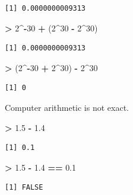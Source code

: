 \documentclass[]{krantz}
\makeatletter
\newenvironment{Shaded}{\begin{snugshade}}{\end{snugshade}}
\newcommand{\DecValTok}[1]{\textcolor[rgb]{0.06,0.06,0.06}{#1}}
\newcommand{\FloatTok}[1]{\textcolor[rgb]{0.06,0.06,0.06}{#1}}
\newcommand{\NormalTok}[1]{#1}
\newcommand{\OperatorTok}[1]{\textcolor[rgb]{0.43,0.43,0.43}{\textbf{#1}}}
\newcommand{\StringTok}[1]{\textcolor[rgb]{0.5,0.5,0.5}{#1}}
\newenvironment{kframe}{%
\medskip{}
\setlength{\fboxsep}{.8em}
 \def\at@end@of@kframe{}%
 \ifinner\ifhmode%
  \def\at@end@of@kframe{\end{minipage}}%
  \begin{minipage}{\columnwidth}%
 \fi\fi%
 \def\FrameCommand##1{\hskip\@totalleftmargin \hskip-\fboxsep
 \colorbox{shadecolor}{##1}\hskip-\fboxsep
     \hskip-\linewidth \hskip-\@totalleftmargin \hskip\columnwidth}%
 \MakeFramed {\advance\hsize-\width
   \@totalleftmargin\z@ \linewidth\hsize
   \@setminipage}}%
 {\par\unskip\endMakeFramed%
 \at@end@of@kframe}
\renewenvironment{Shaded}{\begin{kframe}}{\end{kframe}}
\makeatother
\begin{document}
\begin{verbatim}
[1] 0.0000000009313
\end{verbatim}

\begin{Shaded}
\begin{Highlighting}[]
\OperatorTok{>}\StringTok{ }\DecValTok{2}\OperatorTok{^-}\DecValTok{30} \OperatorTok{+}\StringTok{ }\NormalTok{(}\DecValTok{2}\OperatorTok{^}\DecValTok{30} \OperatorTok{-}\StringTok{ }\DecValTok{2}\OperatorTok{^}\DecValTok{30}\NormalTok{)}
\end{Highlighting}
\end{Shaded}

\begin{verbatim}
[1] 0.0000000009313
\end{verbatim}

\begin{Shaded}
\begin{Highlighting}[]
\OperatorTok{>}\StringTok{ }\NormalTok{(}\DecValTok{2}\OperatorTok{^-}\DecValTok{30} \OperatorTok{+}\StringTok{ }\DecValTok{2}\OperatorTok{^}\DecValTok{30}\NormalTok{) }\OperatorTok{-}\StringTok{ }\DecValTok{2}\OperatorTok{^}\DecValTok{30}
\end{Highlighting}
\end{Shaded}

\begin{verbatim}
[1] 0
\end{verbatim}

Computer arithmetic is not exact.

\begin{Shaded}
\begin{Highlighting}[]
\OperatorTok{>}\StringTok{ }\FloatTok{1.5} \OperatorTok{-}\StringTok{ }\FloatTok{1.4}
\end{Highlighting}
\end{Shaded}

\begin{verbatim}
[1] 0.1
\end{verbatim}

\begin{Shaded}
\begin{Highlighting}[]
\OperatorTok{>}\StringTok{ }\FloatTok{1.5} \OperatorTok{-}\StringTok{ }\FloatTok{1.4} \OperatorTok{==}\StringTok{ }\FloatTok{0.1}
\end{Highlighting}
\end{Shaded}

\begin{verbatim}
[1] FALSE
\end{verbatim}
\end{document}
